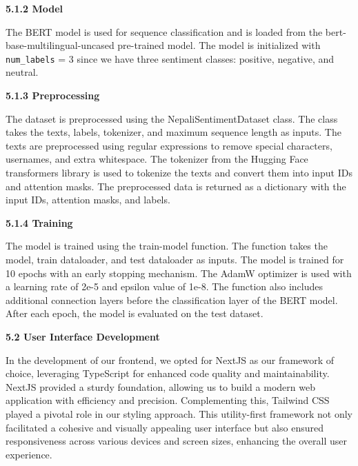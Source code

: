 \documentclass[a4paper,12pt]{article}
\begin{document}
{{{  \begin{flushleft}
			\fontsize{13}{15}\selectfont\textbf{5.1.2 Model}
			\label{model}
		\end{flushleft}
The BERT model is used for sequence classification and is loaded from the bert-base-multilingual-uncased pre-trained model. The model is initialized with \texttt{num\_labels} = 3 since we have three sentiment classes: positive, negative, and neutral.

  
\newpage

    \begin{flushleft}
			\fontsize{13}{15}\selectfont\textbf{5.1.3 Preprocessing}
			\label{preprocess}
		\end{flushleft}
				
The dataset is preprocessed using the NepaliSentimentDataset class. The class takes the texts, labels, tokenizer, and maximum sequence length as inputs. The texts are preprocessed using regular expressions to remove special characters, usernames, and extra whitespace. The tokenizer from the Hugging Face transformers library is used to tokenize the texts and convert them into input IDs and attention masks. The preprocessed data is returned as a dictionary with the input IDs, attention masks, and labels.



\begin{flushleft}
			\fontsize{13}{15}\selectfont\textbf{5.1.4 Training}
			\label{train}
		\end{flushleft}


The model is trained using the train-model function. The function takes the model, train dataloader, and test dataloader as inputs. The model is trained for 10 epochs with an early stopping mechanism. The AdamW optimizer is used with a learning rate of 2e-5 and epsilon value of 1e-8. The function also includes additional connection layers before the classification layer of the BERT model. After each epoch, the model is evaluated on the test dataset.



  \begin{flushleft}
			\fontsize{13}{15}\selectfont\textbf{5.2 User Interface Development}
			\label{user}
		\end{flushleft}

In the development of our frontend, we opted for NextJS as our framework of choice, leveraging TypeScript for enhanced code quality and maintainability. NextJS provided a sturdy foundation, allowing us to build a modern web application with efficiency and precision. Complementing this, Tailwind CSS played a pivotal role in our styling approach. This utility-first framework not only facilitated a cohesive and visually appealing user interface but also ensured responsiveness across various devices and screen sizes, enhancing the overall user experience.

}}}
\end{document}

